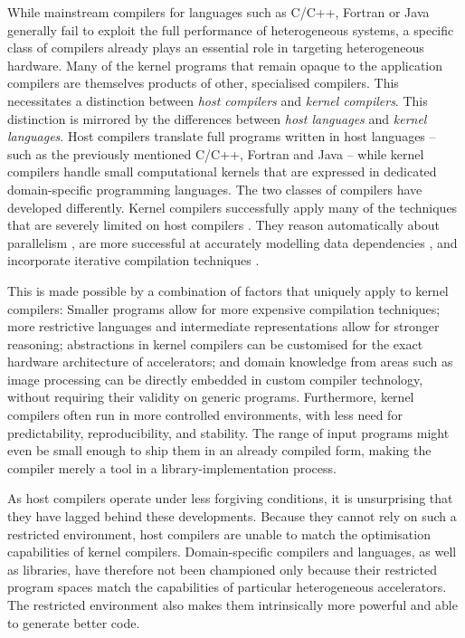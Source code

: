     While mainstream compilers for languages such as C/C++, Fortran or Java
    generally fail to exploit the full performance of heterogeneous systems, a
    specific class of compilers already plays an essential role in
    targeting heterogeneous hardware.
    Many of the kernel programs that remain opaque to the application compilers
    are themselves products of other, specialised compilers.
    This necessitates a distinction between {\em host compilers} and {\em kernel
    compilers}.
    This distinction is mirrored by the differences between {\em host languages}
    and {\em kernel languages}.
    Host compilers translate full programs written in host languages -- such as
    the previously mentioned C/C++, Fortran and Java -- while kernel
    compilers handle small computational kernels that are expressed in dedicated
    domain-specific programming languages.
    The two classes of compilers have developed differently.
    Kernel compilers successfully apply many of the techniques that are severely
    limited on host compilers
    \citep{Murphy2014LimitsOD,Maleki:2011:EVC:2120965.2121464}.
    They reason automatically about parallelism
    \citep{Steuwer:2017:LFD:3049832.3049841}, are more successful at accurately
    modelling data dependencies \citep{Baghdadi:2019:TPC:3314872.3314896}, and
    incorporate iterative compilation techniques
    \citep{Ansel:2014:OEF:2628071.2628092}.

    This is made possible by a combination of factors that uniquely apply to
    kernel compilers:
    Smaller programs allow for more expensive compilation techniques;
    more restrictive languages and intermediate representations allow for
    stronger reasoning;
    abstractions in kernel compilers can be customised for the exact hardware
    architecture of accelerators;
    and domain knowledge from areas such as image processing can be directly
    embedded in custom compiler technology, without requiring their validity
    on generic programs.
    Furthermore, kernel compilers often run in more controlled environments,
    with less need for predictability, reproducibility, and stability.
    The range of input programs might even be small enough to ship them in an
    already compiled form, making the compiler merely a tool in a
    library-implementation process.

    As host compilers operate under less forgiving conditions, it is
    unsurprising that they have lagged behind these developments.
    Because they cannot rely on such a restricted environment, host compilers
    are unable to match the optimisation capabilities of kernel compilers.
    Domain-specific compilers and languages, as well as libraries, have
    therefore not been championed only because their restricted program
    spaces match the capabilities of particular heterogeneous accelerators.
    The restricted environment also makes them intrinsically more powerful and
    able to generate better code.

